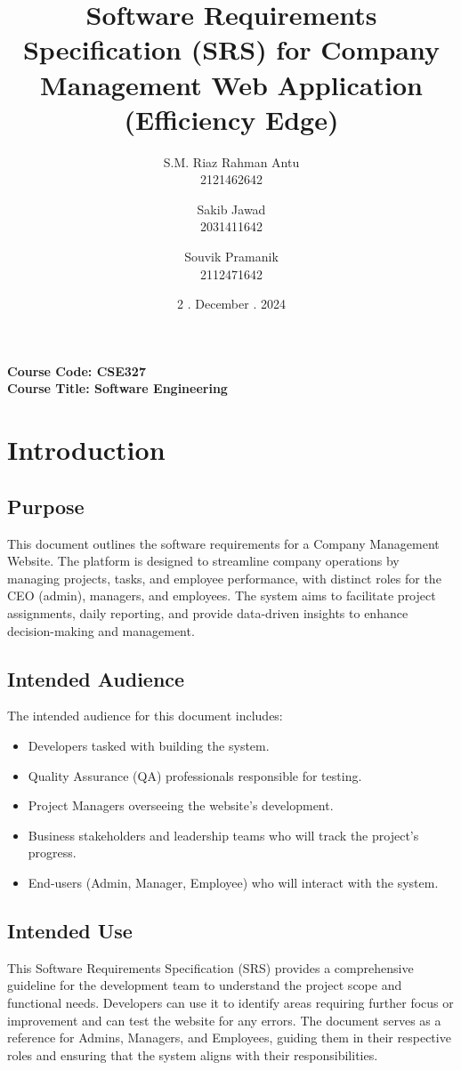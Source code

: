 \documentclass[a4paper,12pt]{article}
\title{Software Requirements Specification (SRS) for Company Management Web Application (Efficiency Edge)}
\author{
    S.M. Riaz Rahman Antu \\ 2121462642 \\[1ex]
    \and
    Sakib Jawad \\ 2031411642 \\[1ex]
    \and
    Souvik Pramanik \\ 2112471642
}
\date{2 . December . 2024}
\newcommand{\courseinfo}{
    \textbf{Course Code: CSE327} \\ 
    \textbf{Course Title: Software Engineering}
}
\begin{document}
\maketitle
\begin{center}
    \courseinfo
\end{center}
\newpage
\tableofcontents
\newpage

\section{Introduction}

\subsection{Purpose}
This document outlines the software requirements for a Company Management Website. The platform is designed to streamline company operations by managing projects, tasks, and employee performance, with distinct roles for the CEO (admin), managers, and employees. The system aims to facilitate project assignments, daily reporting, and provide data-driven insights to enhance decision-making and management.

\subsection{Intended Audience}
The intended audience for this document includes:
\begin{itemize}
    \item Developers tasked with building the system.
    \item Quality Assurance (QA) professionals responsible for testing.
    \item Project Managers overseeing the website’s development.
    \item Business stakeholders and leadership teams who will track the project's progress.
    \item End-users (Admin, Manager, Employee) who will interact with the system.
\end{itemize}

\subsection{Intended Use}
This Software Requirements Specification (SRS) provides a comprehensive guideline for the development team to understand the project scope and functional needs. Developers can use it to identify areas requiring further focus or improvement and can test the website for any errors. The document serves as a reference for Admins, Managers, and Employees, guiding them in their respective roles and ensuring that the system aligns with their responsibilities.
\end{document}
